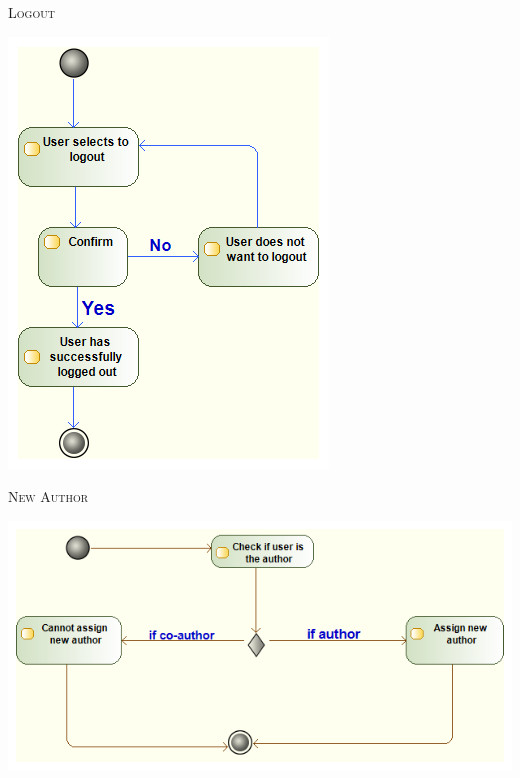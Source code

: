 \documentclass[11pt]{article}
\begin{document}
\newpage
\textsc{Logout}
\begin{center} 
	\includegraphics[width=\textwidth]{../Images/Logout_Activity_Diagram.png}\\[0.5cm]
\end{center}

\newpage
\textsc{New Author}
\begin{center} 
	\includegraphics[width=\textwidth]{../Images/newAuthor_Activity_Diagram.png}\\[0.5cm]
\end{center}
\end{document}
